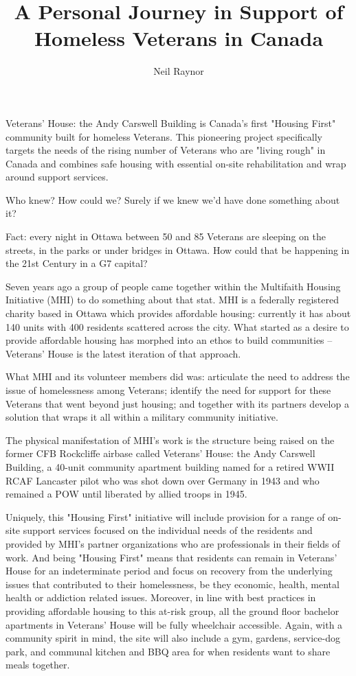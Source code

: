 %


\title{A Personal Journey in Support of Homeless Veterans in Canada}
\author{Neil Raynor}

\maketitle

Veterans' House: the Andy Carswell Building is Canada's first "Housing
First" community built for homeless Veterans. This pioneering project
specifically targets the needs of the rising number of Veterans who are
"living rough" in Canada and combines safe housing with essential
on-site rehabilitation and wrap around support services.


Who knew? How could we? Surely if we knew we'd have done something
about it?

Fact: every night in Ottawa between 50 and 85 Veterans are sleeping on
the streets, in the parks or under bridges in Ottawa. How could that be
happening in the 21st Century in a G7 capital?

Seven years ago a group of people came together within the Multifaith
Housing Initiative (MHI) to do something about that stat. MHI is a
federally registered charity based in Ottawa which provides affordable
housing: currently it has about 140 units with 400 residents scattered
across the city. What started as a desire to provide affordable housing
has morphed into an ethos to build communities – Veterans' House is the
latest iteration of that approach.

What MHI and its volunteer members did was: articulate the need to
address the issue of homelessness among Veterans; identify the need for
support for these Veterans that went beyond just housing; and together
with its partners develop a solution that wraps it all within a
military community initiative.

The physical manifestation of MHI's work is the structure being raised
on the former CFB Rockcliffe airbase called Veterans' House: the Andy
Carswell Building, a 40-unit community apartment building named for a
retired WWII RCAF Lancaster pilot who was shot down over Germany in
1943 and who remained a POW until liberated by allied troops in 1945.

Uniquely, this "Housing First" initiative will include provision for a
range of on-site support services focused on the individual needs of
the residents and provided by MHI's partner organizations who are
professionals in their fields of work. And being "Housing First" means
that residents can remain in Veterans' House for an indeterminate
period and focus on recovery from the underlying issues that
contributed to their homelessness, be they economic, health, mental
health or addiction related issues. Moreover, in line with best
practices in providing affordable housing to this at-risk group, all
the ground floor bachelor apartments in Veterans' House will be fully
wheelchair accessible. Again, with a community spirit in mind, the site
will also include a gym, gardens, service-dog park, and communal
kitchen and BBQ area for when residents want to share meals together.

